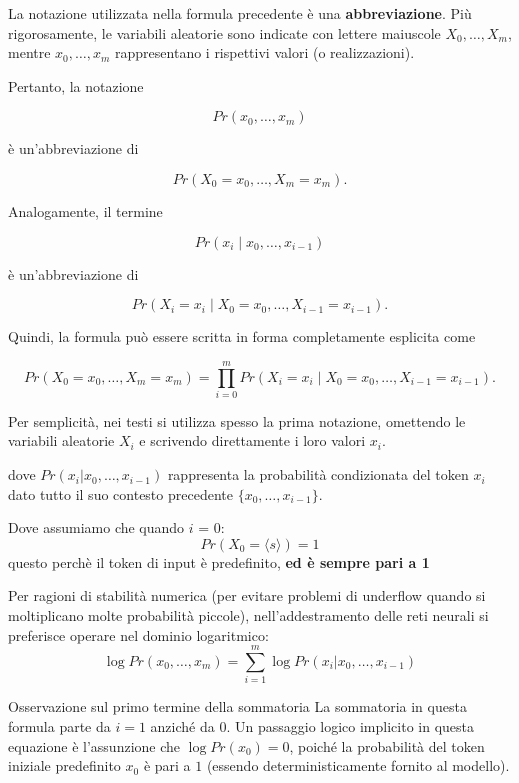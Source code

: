La notazione utilizzata nella formula precedente è una \textbf{abbreviazione}. Più rigorosamente, le variabili aleatorie sono indicate con lettere maiuscole
$X_0, \dots, X_m$, mentre $x_0, \dots, x_m$ rappresentano i rispettivi valori (o realizzazioni).

Pertanto, la notazione

\begin{equation}
Pr(x_0, \dots, x_m)
\end{equation}

è un'abbreviazione di

\begin{equation}
Pr(X_0=x_0, \dots, X_m=x_m).
\end{equation}

Analogamente, il termine

\begin{equation}
Pr(x_i \mid x_0, \dots, x_{i-1})
\end{equation}

è un'abbreviazione di

\begin{equation}
Pr(X_i=x_i \mid X_0=x_0, \dots, X_{i-1}=x_{i-1}).
\end{equation}

Quindi, la formula può essere scritta in forma completamente esplicita come

\begin{equation}
Pr(X_0=x_0, \dots, X_m=x_m)
=
\prod_{i=0}^{m}
Pr(X_i=x_i \mid X_0=x_0, \dots, X_{i-1}=x_{i-1}).
\end{equation}

Per semplicità, nei testi si utilizza spesso la prima notazione, omettendo le variabili aleatorie $X_i$ e scrivendo direttamente i loro valori $x_i$.

dove $Pr(x_i \vert{} x_0, \dots, x_{i-1})$ rappresenta la probabilità condizionata del token $x_i$ dato tutto il suo contesto precedente $\{x_0, \dots, x_{i-1}\}$.


Dove assumiamo che quando $i$ = 0:
$$
Pr(X_0 = ⟨s⟩) = 1
$$
questo perchè il token di input è predefinito, \textbf{ed è sempre pari a 1}


Per ragioni di stabilità numerica (per evitare problemi di underflow quando si moltiplicano molte probabilità piccole), nell'addestramento delle reti neurali si preferisce operare nel dominio logaritmico:
\begin{equation}
\log Pr(x_0, \dots, x_m) = \sum_{i=1}^m \log Pr(x_i | x_0, \dots, x_{i-1})
\end{equation}
\begin{observation}{Osservazione sul primo termine della sommatoria}
La sommatoria in questa formula parte da $i=1$ anziché da $0$. Un passaggio logico implicito in questa equazione è l'assunzione che $\log Pr(x_0) = 0$, poiché la probabilità del token iniziale predefinito $x_0$ è pari a $1$ (essendo deterministicamente fornito al modello).
\end{observation}

